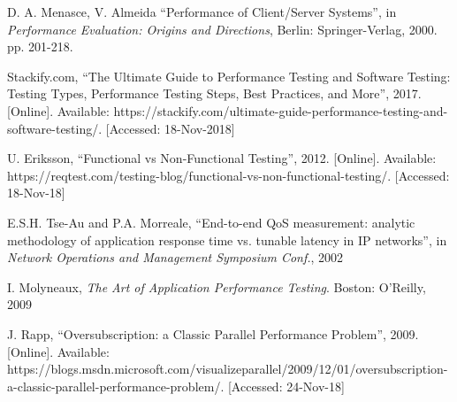 \begin{thebibliography}{999}
	
	D. A. Menasce, V. Almeida
	``Performance of Client/Server Systems'',
	in \textit{Performance Evaluation: Origins and Directions},
	Berlin: Springer-Verlag, 2000.
	pp. 201-218.
	
	Stackify.com,
	``The Ultimate Guide to Performance Testing and Software Testing: Testing Types, Performance Testing Steps, Best Practices, and More'', 2017.
	[Online]. Available: https://stackify.com/ultimate-guide-performance-testing-and-software-testing/.
	[Accessed: 18-Nov-2018]
	
	U. Eriksson,
	``Functional vs Non-Functional Testing'', 2012.
	[Online]. Available: https://reqtest.com/testing-blog/functional-vs-non-functional-testing/.
	[Accessed: 18-Nov-18]
	
	E.S.H. Tse-Au and P.A. Morreale,
	``End-to-end QoS measurement: analytic methodology of application response time vs. tunable latency in IP networks'',
	in \textit{Network Operations and Management Symposium Conf.}, 2002 
	
	I. Molyneaux, \textit{The Art of Application Performance Testing}.
	Boston: O'Reilly,
	2009
	
	J. Rapp, 
	``Oversubscription: a Classic Parallel Performance Problem'', 2009.
	[Online]. Available: https://blogs.msdn.microsoft.com/visualizeparallel/2009/12/01/oversubscription-a-classic-parallel-performance-problem/.
	[Accessed: 24-Nov-18]
\end{thebibliography}